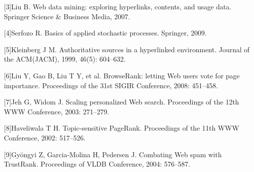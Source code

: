\documentclass[UTF8,12pt,a4paper,fontset=fandol]{ctexart}
\begin{document}
[3]\quad Liu B. Web data mining: exploring hyperlinks, contents, and usage data. Springer Science \& Business Media, 2007.

[4]\quad Serfozo R. Basics of applied stochastic processes. Springer, 2009.

[5]\quad Kleinberg J M. Authoritative sources in a hyperlinked environment. Journal of the ACM(JACM), 1999, 46(5): 604--632.

[6]\quad Liu Y, Gao B, Liu T Y, et al. BrowseRank: letting Web users vote for page importance. Proceedings of the 31st SIGIR Conference, 2008: 451--458.

[7]\quad Jeh G, Widom J. Scaling personalized Web search. Proceedings of the 12th WWW Conference, 2003: 271--279.

[8]\quad Haveliwala T H. Topic-sensitive PageRank. Proceedings of the 11th WWW Conference, 2002: 517--526.

[9]\quad Gyöngyi Z, Garcia-Molina H, Pedersen J. Combating Web spam with TrustRank. Proceedings of VLDB Conference, 2004: 576--587.
\end{document}
